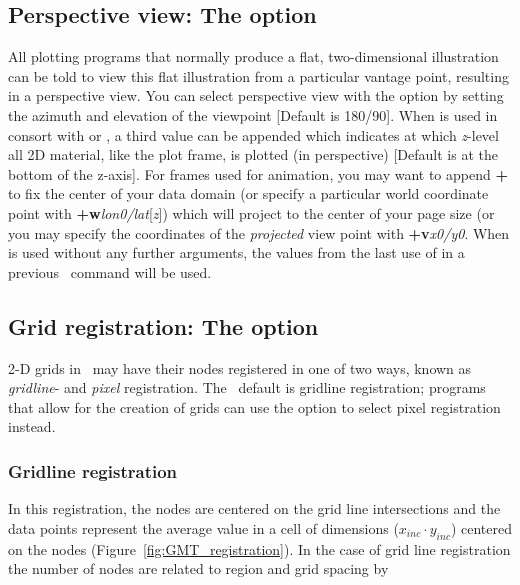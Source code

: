 \subsection{Perspective view: The  option}

All plotting programs that normally produce a flat, two-dimensional illustration can
be told to view this flat illustration from a particular vantage point, resulting in
a perspective view.  You can select perspective view with the  option by setting
the azimuth and elevation of the viewpoint [Default is 180/90].
When  is used in consort with  or , a third value can be appended which indicates
at which {\it z}-level all 2D material, like the plot frame, is plotted (in perspective) 
[Default is at the bottom of the z-axis].
For frames used for animation, you may want to append {\bf +} to fix the center
of your data domain (or specify a particular world coordinate point with {\bf +w}{\it lon0/lat}[{\it z}])
which will project to the center of your page size (or you may specify the coordinates
of the \emph{projected} view point with {\bf +v}{\it x0/y0}.
When  is used without any further arguments, the values from the last use of  in a previous \GMT\
command will be used.

\subsection{Grid registration: The  option}
\label{sec:grid_registration}
2-D grids in \GMT\ may have their nodes registered in one of two ways, known
as \emph{gridline}- and \emph{pixel} registration.  The \GMT\ default is
gridline registration; programs that allow for the creation of grids can
use the \Opt{r} option to select pixel registration instead.

\subsubsection{Gridline registration}

In this registration, the nodes are centered on the grid line
intersections and the data points represent the average value
in a cell of dimensions ($x_{inc} \cdot y_{inc}$) centered on the
nodes (Figure~\ref{fig:GMT_registration}).
In the case of grid line registration the number of nodes are
related to region and grid spacing by \\

